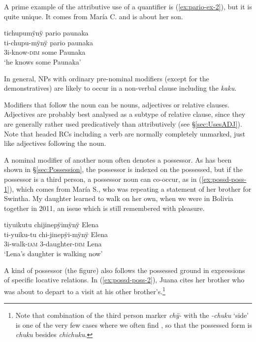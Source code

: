 {A prime example of the attributive use of a quantifier is (\ref{ex:pario-ex-2}), but it is quite unique. It comes from María C. and is about her son.

\ea\label{ex:pario-ex-2}
\begingl
\glpreamble tichupumÿnÿ pario paunaka\\
\gla ti-chupu-mÿnÿ pario paunaka\\
\glb 3i-know-\textsc{dim} some Paunaka\\
\glft ‘he knows some Paunaka’
\endgl
\trailingcitation{[cux-c120414ls-2.269]}
\xe
{}

In general, NPs with ordinary pre-nominal modifiers (except for the demonstratives) are likely to occur in a non-verbal clause including the  \textit{kaku}.

Modifiers that follow the noun can be nouns, adjectives or relative clauses. Adjectives are probably best analysed as a subtype of relative clause, since they are generally rather used predicatively than attributively (see §\ref{sec:UsesADJ}). Note that headed RCs including a verb are normally completely unmarked, just like adjectives following the noun.

A nominal modifier of another noun often denotes a possessor. As has been shown in §\ref{sec:Possession}, the possessor is indexed on the possessed, but if the possessor is a third person, a possessor noun can co-occur, as in (\ref{ex:possd-poss-1}), which comes from María S., who was repeating a statement of her brother for Swintha. My daughter learned to walk on her own, when we were in Bolivia together in 2011, an issue which is still remembered with pleasure.

\ea\label{ex:possd-poss-1}
\begingl
\glpreamble tiyuikutu chijinepÿimÿnÿ Elena\\
\gla ti-yuiku-tu chi-jinepÿi-mÿnÿ Elena\\
\glb 3i-walk-\textsc{iam} 3-daughter-\textsc{dim} Lena\\
\glft ‘Lena’s daughter is walking now’
\endgl
\trailingcitation{[rxx-e121128s-1.071]}
\xe

A kind of possessor (the figure) also follows the possessed ground in expressions of specific locative relations. In (\ref{ex:possd-poss-2}), Juana cites her brother who was about to depart to a visit at his other brother’s.\footnote{Note that combination of the third person marker \textit{chÿ-} with the  \textit{-chuku} ‘side’ is one of the very few cases where we often find , so that the possessed form is \textit{chuku} besides \textit{chichuku}.}

}
